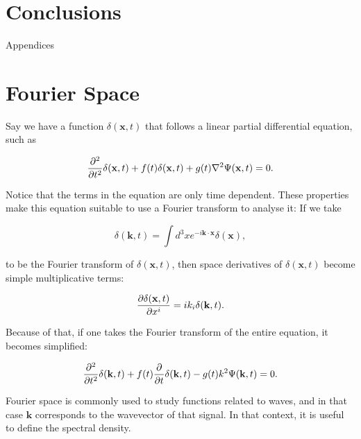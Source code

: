 \documentclass[openany,a4paper,12pt,oneside]{book}
\begin{document}
\begin{spacing}{1.5}
\chapter{Conclusions}

\appendix

\newpage

\begin{center}
\thispagestyle{empty}
\vspace*{\fill}
\Huge{Appendices}
\vspace*{\fill}
\end{center}

\iffalse %
\chapter{Fourier Space}\label{appendix:FourierSpace}

Say we have a function $\delta(\mathbf{x},t)$ that follows a linear partial differential equation, such as

\begin{equation}\label{Four_Space:example_diff_eq}
	\pdv[2]{}{t} \delta(\mathbf{x},t) +f(t)\delta(\mathbf{x},t) + g(t)\nabla^2\Psi(\mathbf{x},t)=0.
\end{equation}

Notice that the terms in the equation are only time dependent. These properties make this equation suitable to use a Fourier transform to analyse it: If we take

\begin{equation}
	\delta(\mathbf{k},t)=\int d^3x e^{-i\mathbf{k}\cdot \mathbf{x}}\delta(\mathbf{x}),
\end{equation}

\noindent to be the Fourier transform of $\delta(\mathbf{x},t)$, then space derivatives of $\delta(\mathbf{x},t)$ become simple multiplicative terms:

\begin{equation}
	\pdv{\delta(\mathbf{x},t)}{x^i}=ik_i\delta(\mathbf{k},t).
\end{equation}

Because of that, if one takes the Fourier transform of the entire equation, it becomes simplified:

\begin{equation}\label{Four_Space:final_eq}
	\pdv[2]{}{t}\delta(\mathbf{k},t)+f(t)\pdv{}{t}\delta(\mathbf{k},t)-g(t)k^2\Psi(\mathbf{k},t)=0.
\end{equation}

Fourier space is commonly used to study functions related to waves, and in that case $\mathbf{k}$ corresponds to the wavevector of that signal. In that context, it is useful to define the spectral density.


\end{spacing}
\end{document}
